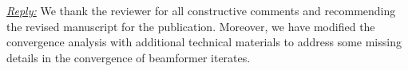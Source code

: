 
\vspace{1eM}
\underline{\textit{Reply:}} We thank the reviewer for all constructive comments and recommending the revised manuscript for the publication. Moreover, we have modified the convergence analysis with additional technical materials to address some missing details in the convergence of beamformer iterates.
